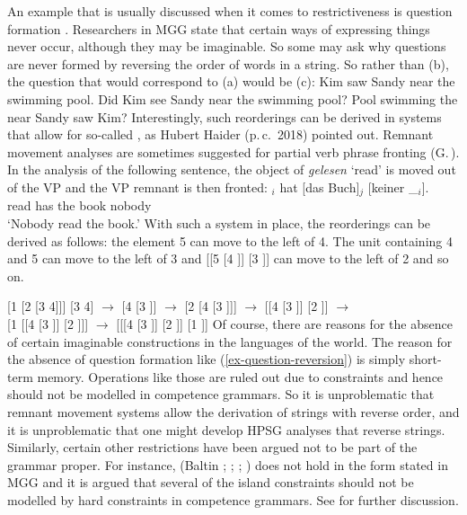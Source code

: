 \documentclass[output=paper
                ,modfonts
                ,nonflat
	        ,collection
	        ,collectionchapter
	        ,collectiontoclongg
 	        ,biblatex
                ,babelshorthands
                ,newtxmath
                ,draftmode
                ,colorlinks, citecolor=brown
]{./langsci/langscibook}
\begin{document}
An example that is usually discussed when it comes to restrictiveness is question
formation \citep{MMGRRBW2003a}. Researchers in MGG state that certain ways of expressing things never occur, although
they may be imaginable. So some may ask why questions are never formed by reversing the
order of words in a string. So rather than (b), the question that would correspond to
(a) would be (c):
\eal
\ex Kim saw Sandy near the swimming pool.
\ex Did Kim see Sandy near the swimming pool?
\ex\label{ex-question-reversion} 
Pool swimming the near Sandy saw Kim?
\zl
Interestingly, such reorderings can be derived in systems that allow for so-called
\emph{}, as Hubert Haider (p.\,c.\ 2018) pointed
out. Remnant movement analyses are sometimes suggested for partial verb phrase fronting
(G.\,\citealp{GMueller98a}). In the analysis of the following sentence, the object of \emph{gelesen}
`read' is moved out of the VP and the VP remnant is then fronted:
\ea
{}$_i$ hat [das Buch]$_j$ [keiner \_$_i$].\\
     {}        {}     read         has \spacebr{}the book \spacebr{}nobody\\
\glt `Nobody read the book.'
\z
\noindent
With such a system in place, the reorderings can be derived as follows: the element 5 can move to the left of 4. The unit containing 4 and 5 can move to the left of 3 and [[5 [4 \trace]] [3
    \trace]] can move to the left of 2 and so on.

\eal
\ex{} [1 [2 [3 4]]] 
\ex {} [3 4] $\to$ [4 [3 \trace]] $\to$ [2 [4 [3 \trace]]] $\to$ [[4 [3 \trace]] [2 \trace]] $\to$\\
    {} [1 [[4 [3 \trace]] [2 \trace]]] $\to$ [[[4 [3 \trace]] [2 \trace]] [1 \trace]]
\zl
Of course, there are reasons for the absence of certain imaginable constructions in the languages of
the world. The reason for the absence of question formation like (\ref{ex-question-reversion}) is
simply short-term memory. Operations like those are ruled out due to  constraints and
hence should not be modelled in competence grammars. So it is unproblematic that remnant movement
systems allow the derivation of strings with reverse order, and it is unproblematic that one might
develop HPSG analyses that reverse strings. Similarly, certain other restrictions have been argued
not to be part of the grammar proper. For instance,  (Baltin \citeyear[]{Baltin81a};
\citeyear{Baltin2006a}; \citealp[]{Rizzi82b}; \citealp[--40]{Chomsky86b}) does not hold in the form stated in
MGG \parencites{Mueller2004d}[Section~13.1.5]{MuellerGT-Eng1} and it is argued that several of the
island constraints should not be modelled by hard constraints in competence grammars. See
 for further discussion. 
\end{document}
